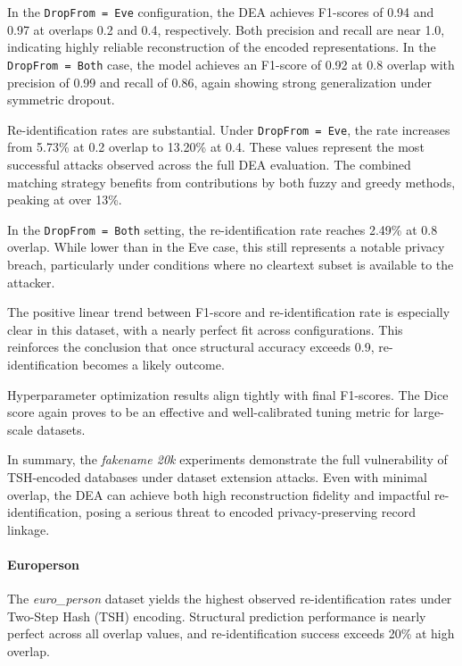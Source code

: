 In the \texttt{DropFrom = Eve} configuration, the DEA achieves F1-scores of 0.94 and 0.97 at overlaps 0.2 and 0.4, respectively. Both precision and recall are near 1.0, indicating highly reliable reconstruction of the encoded representations. In the \texttt{DropFrom = Both} case, the model achieves an F1-score of 0.92 at 0.8 overlap with precision of 0.99 and recall of 0.86, again showing strong generalization under symmetric dropout.

Re-identification rates are substantial. Under \texttt{DropFrom = Eve}, the rate increases from 5.73\% at 0.2 overlap to 13.20\% at 0.4. These values represent the most successful attacks observed across the full DEA evaluation. The combined matching strategy benefits from contributions by both fuzzy and greedy methods, peaking at over 13\%.

In the \texttt{DropFrom = Both} setting, the re-identification rate reaches 2.49\% at 0.8 overlap. While lower than in the Eve case, this still represents a notable privacy breach, particularly under conditions where no cleartext subset is available to the attacker.

The positive linear trend between F1-score and re-identification rate is especially clear in this dataset, with a nearly perfect fit across configurations. This reinforces the conclusion that once structural accuracy exceeds 0.9, re-identification becomes a likely outcome.

Hyperparameter optimization results align tightly with final F1-scores. The Dice score again proves to be an effective and well-calibrated tuning metric for large-scale datasets.

In summary, the \textit{fakename 20k} experiments demonstrate the full vulnerability of TSH-encoded databases under dataset extension attacks. Even with minimal overlap, the DEA can achieve both high reconstruction fidelity and impactful re-identification, posing a serious threat to encoded privacy-preserving record linkage.


\paragraph{Europerson}

The \textit{euro\_person} dataset yields the highest observed re-identification rates under Two-Step Hash (TSH) encoding. Structural prediction performance is nearly perfect across all overlap values, and re-identification success exceeds 20\% at high overlap.

